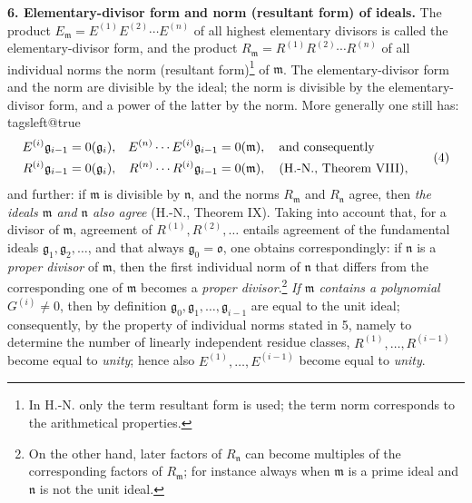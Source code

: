 \documentclass[11pt]{article}
\providecommand{\frakm}{\mathfrak m}
\providecommand{\frakn}{\mathfrak n}
\providecommand{\frakg}{\mathfrak g}
\providecommand{\frako}{\mathfrak o}
\providecommand{\frako}{\mathfrak o}
\begin{document}
\textbf{6. Elementary-divisor form and norm (resultant form) of ideals.} The product $E_\frakm=E^{(1)}E^{(2)}\cdots E^{(n)}$ of all highest elementary divisors is called the elementary-divisor form, and the product $R_\frakm=R^{(1)}R^{(2)}\cdots R^{(n)}$ of all individual norms the norm (resultant form)\footnote{In H.-N. only the term resultant form is used; the term norm corresponds to the arithmetical properties.} of $\frakm$. The elementary-divisor form and the norm are divisible by the ideal; the norm is divisible by the elementary-divisor form, and a power of the latter by the norm. More generally one still has:
{\csname tagsleft@true\endcsname\begin{align}
 E^{(i)}\frakg_{i-1}&=0(\frakg_i),
& E^{(n)}\cdots E^{(i)}\frakg_{i-1}&=0(\frakm),\quad\text{and consequently}\notag\\
 R^{(i)}\frakg_{i-1}&=0(\frakg_i),
& R^{(n)}\cdots R^{(i)}\frakg_{i-1}&=0(\frakm),\quad\text{(H.-N., Theorem VIII),} \tag*{\raisebox{8.5pt}[0pt][0pt]{(4)}}
\end{align}}
and further: if $\frakm$ is divisible by $\frakn$, and the norms $R_\frakm$ and $R_\frakn$ agree, then \emph{the ideals $\frakm$ and $\frakn$ also agree} (H.-N., Theorem IX). Taking into account that, for a divisor of $\frakm$, agreement of $R^{(1)},R^{(2)},\ldots$ entails agreement of the fundamental ideals $\frakg_1,\frakg_2,\ldots$, and that always $\frakg_0=\frako$, one obtains correspondingly: if $\frakn$ is a \emph{proper divisor} of $\frakm$, then the first individual norm of $\frakn$ that differs from the corresponding one of $\frakm$ becomes a \emph{proper divisor}.\footnote{On the other hand, later factors of $R_\frakn$ can become multiples of the corresponding factors of $R_\frakm$; for instance always when $\frakm$ is a prime ideal and $\frakn$ is not the unit ideal.} \emph{If $\frakm$ contains a polynomial $G^{(i)}\ne0$}, then by definition $\frakg_0,\frakg_1,\ldots,\frakg_{i-1}$ are equal to the unit ideal; consequently, by the property of individual norms stated in 5, namely to determine the number of linearly independent residue classes, $R^{(1)},\ldots,R^{(i-1)}$ become equal to \emph{unity}; hence also $E^{(1)},\ldots,E^{(i-1)}$ become equal to \emph{unity}.
\end{document}
